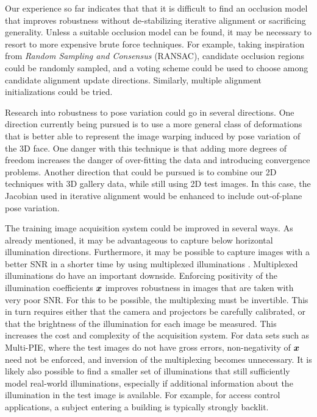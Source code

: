 Our experience so far indicates that that it is difficult to find an occlusion
model that improves robustness without de-stabilizing iterative alignment or
sacrificing generality.  Unless a suitable occlusion model can be found, it may
be necessary to resort to more expensive brute force techniques. For example,
taking inspiration from {\em Random Sampling and Consensus} (RANSAC), candidate
occlusion regions could be randomly sampled, and a voting scheme could be used
to choose among candidate alignment update directions.  Similarly, multiple
alignment initializations could be tried. 

Research into robustness to pose variation could go in several directions.  One
direction currently being pursued is to use a more general class of
deformations that is better able to represent the image warping induced by pose
variation of the 3D face.  One danger with this technique is that adding more
degrees of freedom increases the danger of over-fitting the data and
introducing convergence problems.  Another direction that could be pursued is
to combine our 2D techniques with 3D gallery data, while still using 2D test
images.  In this case, the Jacobian used in iterative alignment would be
enhanced to include out-of-plane pose variation.

The training image acquisition system could be improved in several ways.  As
already mentioned, it may be advantageous to capture below horizontal
illumination directions.  Furthermore, it may be possible to capture images
with a better SNR in a shorter time by using multiplexed illuminations
\cite{schechner2007multiplexing}.  Multiplexed illuminations do have an
important downside. Enforcing positivity of the illumination coefficients 
${\boldsymbol{x}}$ improves robustness in images that are taken with very poor SNR.  For this
to be possible, the multiplexing must be invertible.  This in turn requires either
that the camera and projectors be carefully calibrated, or that the
brightness of the illumination for each image be measured. This increases the
cost and complexity of the acquisition system.  For data sets such as
Multi-PIE, where the test images do not have gross errors, non-negativity of
${\boldsymbol{x}}$ need not be enforced, and inversion of the multiplexing becomes
unnecessary.  It is likely also possible to find a smaller set of illuminations
that still sufficiently model real-world illuminations, especially if
additional
information about the illumination in the test image is available.  For
example, for access control applications, a subject entering a building is
typically strongly backlit.




